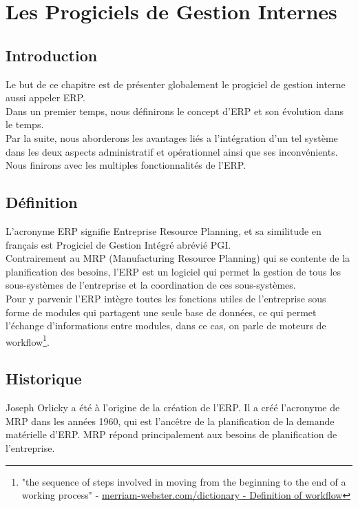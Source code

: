 \chapter{Les Progiciels de Gestion Internes}

\section{Introduction}
Le but de ce chapitre est de présenter globalement le progiciel de gestion interne aussi appeler \acs{ERP}.\\

Dans un premier temps, nous définirons le concept d'\acs{ERP} et son évolution dans le temps.\\

Par la suite, nous aborderons les avantages liés a l'intégration d'un tel système dans les deux aspects administratif et opérationnel ainsi que ses inconvénients.\\

Nous finirons avec les multiples fonctionnalités de l'\acs{ERP}.\\

\section{Définition}
L'acronyme \acs{ERP} signifie Entreprise Resource Planning\cite{def-erp}, et sa similitude en français est Progiciel de Gestion Intégré abrévié \acs{PGI}.\\

Contrairement au \acs{MRP} (Manufacturing Resource Planning) qui se contente de la planification des besoins, l'\acs{ERP} est un logiciel qui permet la gestion de tous les sous-systèmes de l'entreprise et la coordination de ces sous-systèmes.\\

Pour y parvenir l’\acs{ERP} intègre toutes les fonctions utiles de l'entreprise sous forme de modules qui partagent une seule base de données, ce qui permet l'échange d'informations entre modules, dans ce cas, on parle de moteurs de workflow\footnote{"the sequence of steps involved in moving from the beginning to the end of a working process" - \href{https://www.merriam-webster.com/dictionary/workflow}{merriam-webster.com/dictionary - Definition of workflow}}.\\

\section{Historique}
Joseph Orlicky a été à l'origine de la création de l'\acs{ERP}.\cite{hist-erp} Il a créé l'acronyme de \acs{MRP} dans les années 1960, qui est l'ancêtre de la planification de la demande matérielle d'\acs{ERP}. \acs{MRP} répond principalement aux besoins de planification de l'entreprise.\\

